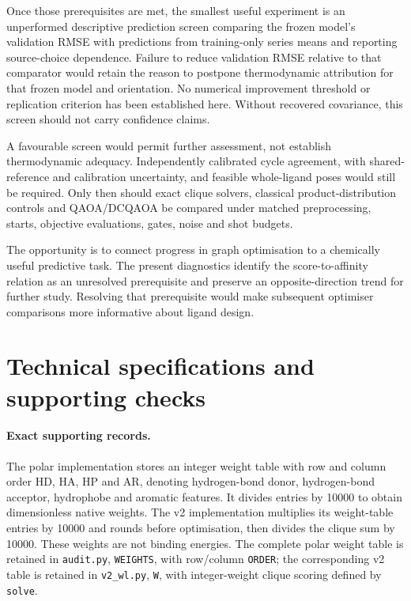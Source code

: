 \documentclass{article}
\begin{document}
Once those prerequisites are met, the smallest useful experiment is an unperformed descriptive prediction screen comparing the frozen model's validation RMSE with predictions from training-only series means and reporting source-choice dependence. Failure to reduce validation RMSE relative to that comparator would retain the reason to postpone thermodynamic attribution for that frozen model and orientation. No numerical improvement threshold or replication criterion has been established here. Without recovered covariance, this screen should not carry confidence claims.

A favourable screen would permit further assessment, not establish thermodynamic adequacy. Independently calibrated cycle agreement, with shared-reference and calibration uncertainty, and feasible whole-ligand poses would still be required. Only then should exact clique solvers, classical product-distribution controls and QAOA/DCQAOA be compared under matched preprocessing, starts, objective evaluations, gates, noise and shot budgets.

The opportunity is to connect progress in graph optimisation to a chemically useful predictive task. The present diagnostics identify the score-to-affinity relation as an unresolved prerequisite and preserve an opposite-direction trend for further study. Resolving that prerequisite would make subsequent optimiser comparisons more informative about ligand design.

\appendix
\section{Technical specifications and supporting checks}

\paragraph{Exact supporting records.}
The polar implementation stores an integer weight table with row and column order HD, HA, HP and AR, denoting hydrogen-bond donor, hydrogen-bond acceptor, hydrophobe and aromatic features. It divides entries by 10000 to obtain dimensionless native weights. The v2 implementation multiplies its weight-table entries by 10000 and rounds before optimisation, then divides the clique sum by 10000. These weights are not binding energies. The complete polar weight table is retained in \texttt{audit.py}, \texttt{WEIGHTS}, with row/column \texttt{ORDER}; the corresponding v2 table is retained in \texttt{v2\_wl.py}, \texttt{W}, with integer-weight clique scoring defined by \texttt{solve}.
\end{document}
